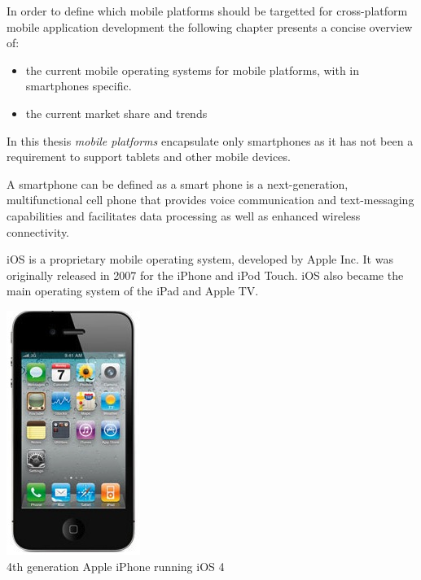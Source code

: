 



In order to define which mobile platforms should be targetted for cross-platform mobile application development the following chapter presents a concise overview of:

\begin{itemize}
\item
the current mobile operating systems for mobile platforms, with in smartphones specific. 
\item
the current market share and trends
\end{itemize}

In this thesis \emph{mobile platforms} encapsulate only smartphones as it has not been a requirement to support tablets and other mobile devices.

A smartphone can be defined as a smart phone is a next-generation, multifunctional cell phone that provides voice communication and text-messaging capabilities and facilitates data processing as well as enhanced wireless connectivity.\cite{Ni2006}



iOS is a proprietary mobile operating system, developed by Apple Inc. It was originally released in 2007 for the iPhone and iPod Touch. iOS also became the main operating system of the iPad and Apple TV.

\begin{centering}
\includegraphics[scale=0.5]{images/iphone4.jpg}\\{4th generation Apple iPhone running iOS 4}\\
\end{centering}


